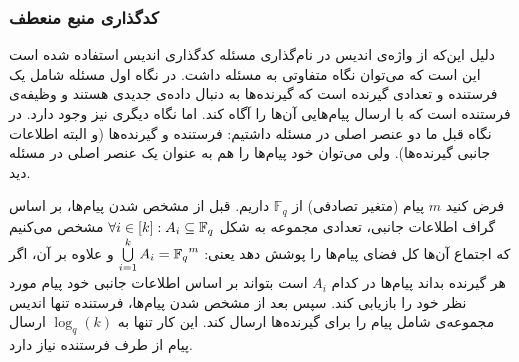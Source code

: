 \subsubsection{
		کدگذاری منبع منعطف
}
\begin{recal}
	دلیل این‌که از واژه‌ی اندیس در نام‌گذاری مسئله کدگذاری اندیس استفاده شده است این است که می‌توان نگاه متفاوتی به مسئله داشت. در نگاه اول مسئله شامل یک فرستنده و تعدادی گیرنده است که گیرنده‌ها به دنبال داده‌ی جدیدی هستند و وظیفه‌ی فرستنده است که با ارسال پیام‌هایی آن‌ها را آگاه کند. اما نگاه دیگری نیز وجود دارد. در نگاه قبل ما دو عنصر اصلی در مسئله داشتیم: فرستنده و گیرنده‌ها (و البته اطلاعات جانبی گیرنده‌ها). ولی می‌توان خود پیام‌ها را هم به عنوان یک عنصر اصلی در مسئله دید.
	
فرض کنید 
$m$
پیام (متغیر‌ تصادفی) از
$\mathbb{F}_q$
 داریم. قبل از مشخص شدن پیام‌ها، بر اساس گراف اطلاعات جانبی، تعدادی مجموعه به شکل
 $\forall i \in [k]: A_i \subseteq {\mathbb{F}_q}$
 مشخص می‌کنیم که اجتماع آن‌ها کل فضای پیام‌ها را پوشش دهد یعنی:
 $ \bigcup\limits_{i = 1}^k A_i = {\mathbb{F}_q}^m $
 و علاوه بر آن، اگر هر گیرنده بداند پیام‌ها در کدام
 $A_i$
 است بتواند بر اساس اطلاعات جانبی خود پیام مورد نظر خود را بازیابی کند. سپس بعد از مشخص شدن پیام‌ها، فرستنده تنها اندیس مجموعه‌ی شامل پیام را برای گیرنده‌ها ارسال کند. این کار تنها به
 $\log_q(k)$
 ارسال پیام از طرف فرستنده نیاز دارد.
\end{recal}
